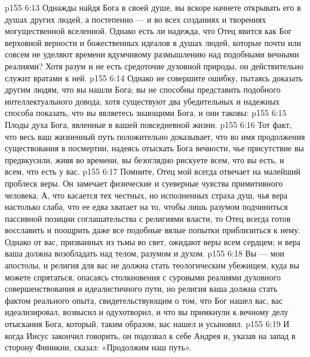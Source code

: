 \vs p155 6:13 Однажды найдя Бога в своей душе, вы вскоре начнете открывать его в душах других людей, а постепенно --- и во всех созданиях и творениях могущественной вселенной. Однако есть ли надежда, что Отец явится как Бог верховной верности и божественных идеалов в душах людей, которые почти или совсем не уделяют времени вдумчивому размышлению над подобными вечными реалиями? Хотя разум и не есть средоточие духовной природы, он действительно служит вратами к ней.
\vs p155 6:14 Однако не совершите ошибку, пытаясь доказать другим людям, что вы нашли Бога; вы не способны представить подобного интеллектуального довода, хотя существуют два убедительных и надежных способа показать, что вы являетесь знающими Бога, и они таковы:
\vs p155 6:15 \bibnobreakspace Плоды духа Бога, явленные в вашей повседневной жизни.
\vs p155 6:16 \bibnobreakspace Тот факт, что весь ваш жизненный путь положительно доказывает, что во имя продолжения существования в посмертии, надеясь отыскать Бога вечности, чье присутствие вы предвкусили, живя во времени, вы безоглядно рискуете всем, что вы есть, и всем, что есть у вас.
\vs p155 6:17 \pc Помните, Отец мой всегда отвечает на малейший проблеск веры. Он замечает физические и суеверные чувства примитивного человека. А, что касается тех честных, но исполненных страха душ, чья вера настолько слаба, что ее едва хватает на то, чтобы лишь разумом подчиниться пассивной позиции соглашательства с религиями власти, то Отец всегда готов восславить и поощрить даже все подобные вялые попытки приблизиться к нему. Однако от вас, призванных из тьмы во свет, ожидают веры всем сердцем; и вера ваша должна возобладать над телом, разумом и духом.
\vs p155 6:18 Вы --- мои апостолы, и религия для вас не должна стать теологическим убежищем, куда вы можете спрятаться, опасаясь столкновения с суровыми реалиями духовного совершенствования и идеалистичного пути, но религия ваша должна стать фактом реального опыта, свидетельствующим о том, что Бог нашел вас, вас идеализировал, возвысил и одухотворил, и что вы примкнули к вечному делу отыскания Бога, который, таким образом, вас нашел и усыновил.
\vs p155 6:19 \pc И когда Иисус закончил говорить, он подозвал к себе Андрея и, указав на запад в сторону Финикии, сказал: «Продолжим наш путь».
